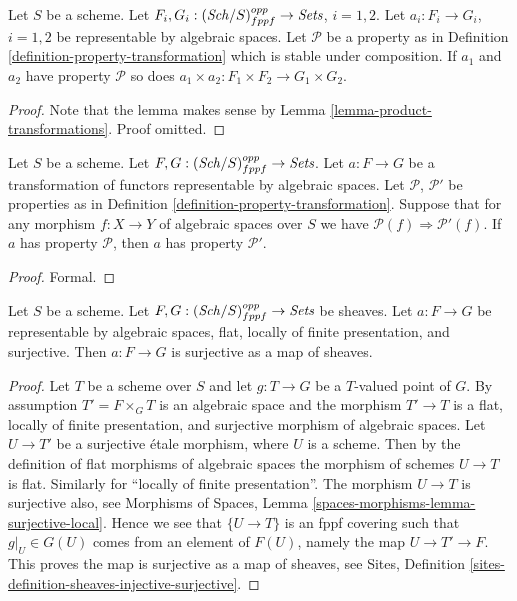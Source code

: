 \begin{lemma}
\label{lemma-product-transformations-property}
Let $S$ be a scheme.
Let $F_i, G_i : (\mathit{Sch}/S)_{fppf}^{opp} \to \textit{Sets}$,
$i = 1, 2$.
Let $a_i : F_i \to G_i$, $i = 1, 2$ be representable by algebraic spaces.
Let $\mathcal{P}$ be a property as in
Definition \ref{definition-property-transformation}
which is stable under composition.
If $a_1$ and $a_2$ have property $\mathcal{P}$ so does
$a_1 \times a_2 : F_1 \times F_2 \longrightarrow G_1 \times G_2$.
\end{lemma}

\begin{proof}
Note that the lemma makes sense by
Lemma \ref{lemma-product-transformations}.
Proof omitted.
\end{proof}

\begin{lemma}
\label{lemma-transformations-property-implication}
Let $S$ be a scheme.
Let $F, G : (\mathit{Sch}/S)_{fppf}^{opp} \to \textit{Sets}$.
Let $a : F \to G$ be a transformation of functors representable by
algebraic spaces.
Let $\mathcal{P}$, $\mathcal{P}'$ be properties as in
Definition \ref{definition-property-transformation}.
Suppose that for any morphism $f : X \to Y$ of algebraic spaces over $S$
we have $\mathcal{P}(f) \Rightarrow \mathcal{P}'(f)$.
If $a$ has property $\mathcal{P}$, then
$a$ has property $\mathcal{P}'$.
\end{lemma}

\begin{proof}
Formal.
\end{proof}

\begin{lemma}
\label{lemma-surjective-flat-locally-finite-presentation}
Let $S$ be a scheme.
Let $F, G : (\mathit{Sch}/S)_{fppf}^{opp} \to \textit{Sets}$ be sheaves.
Let $a : F \to G$ be representable by algebraic spaces, flat,
locally of finite presentation, and surjective.
Then $a : F \to G$ is surjective as a map of sheaves.
\end{lemma}

\begin{proof}
Let $T$ be a scheme over $S$ and let $g : T \to G$ be a $T$-valued point of
$G$. By assumption $T' = F \times_G T$ is an algebraic space and
the morphism $T' \to T$ is a flat, locally of finite presentation, and
surjective morphism of algebraic spaces.
Let $U \to T'$ be a surjective \'etale morphism, where $U$ is a scheme.
Then by the definition of flat morphisms of algebraic spaces
the morphism of schemes $U \to T$ is flat. Similarly for
``locally of finite presentation''. The morphism $U \to T$ is surjective
also, see
Morphisms of Spaces, Lemma \ref{spaces-morphisms-lemma-surjective-local}.
Hence we see that $\{U \to T\}$ is an fppf covering such
that $g|_U \in G(U)$ comes from an element of $F(U)$, namely
the map $U \to T' \to F$. This proves the map is surjective as
a map of sheaves, see
Sites, Definition \ref{sites-definition-sheaves-injective-surjective}.
\end{proof}




